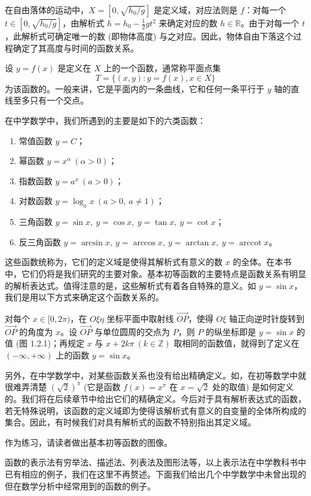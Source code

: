 \documentclass[UTF8,12pt,a4paper,fontset=fandol]{ctexbook}
\begin{document}
在自由落体的运动中，$X=[0,\sqrt{h_0/g}]$ 是定义域，对应法则是 $f$：对每一个 $t\in[0,\sqrt{h_0/g}]$，由解析式 $h=h_0-\frac12gt^2$ 来确定对应的数 $h\in\mathbb{R}$。由于对每一个 $t$，此解析式可确定唯一的数 (即物体高度) 与之对应。因此，物体自由下落这个过程确定了其高度与时间的函数关系。

设 $y=f(x)$ 是定义在 $X$ 上的一个函数，通常称平面点集
\[
  T=\{(x,y):y=f(x),x\in X\}
\]
为该函数的。一般来讲，它是平面内的一条曲线，它和任何一条平行于 $y$ 轴的直线至多只有一个交点。

在中学数学中，我们所遇到的主要是如下的六类函数：
\begin{enumerate}
  \item 常值函数 $y=C$；
  \item 幂函数 $y=x^\alpha\ (\alpha>0)$；
  \item 指数函数 $y=a^x\ (a>0)$；
  \item 对数函数 $y=\log_a x\ (a>0,\ a\ne1)$；
  \item 三角函数 $y=\sin x,\ y=\cos x,\ y=\tan x,\ y=\cot x$；
  \item 反三角函数 $y=\arcsin x,\ y=\arccos x,\ y=\arctan x,\ y=\operatorname{arccot} x$。
\end{enumerate}
这些函数统称为，它们的定义域是使得其解析式有意义的数 $x$ 的全体。在本书中，它们仍将是我们研究的主要对象。基本初等函数的主要特点是函数关系有明显的解析表达式。值得注意的是，这些解析式有着各自特殊的意义。如 $y=\sin x$，我们是用以下方式来确定这个函数关系的。

对每个 $x\in[0,2\pi)$，在 $O\xi\eta$ 坐标平面中取射线 $\overrightarrow{OP}$，使得 $O\xi$ 轴正向逆时针旋转到 $\overrightarrow{OP}$ 的角度为 $x$。设 $\overrightarrow{OP}$ 与单位圆周的交点为 $P$，则 $P$ 的纵坐标即是 $y=\sin x$ 的值 (图 1.2.1)；再规定 $x$ 与 $x+2k\pi\ (k\in\mathbb{Z})$ 取相同的函数值，就得到了定义在 $(-\infty,+\infty)$ 上的函数 $y=\sin x$。

另外，在中学数学中，对某些函数关系也没有给出精确定义。如，在初等数学中就很难弄清楚 $(\sqrt2)^\pi$ (它是函数 $f(x)=x^\pi$ 在 $x=\sqrt2$ 处的取值) 是如何定义的。我们将在后续章节中给出它们的精确定义。今后对于具有解析表达式的函数，若无特殊说明，该函数的定义域即为使得该解析式有意义的自变量的全体所构成的集合。因此，有时候我们对具有解析式的函数不特别指出其定义域。

作为练习，请读者做出基本初等函数的图像。

函数的表示法有穷举法、描述法、列表法及图形法等，以上表示法在中学教科书中已有相应的例子，我们在这里不再赘述。下面我们给出几个中学数学中未曾出现的但在数学分析中经常用到的函数的例子。
\end{document}
